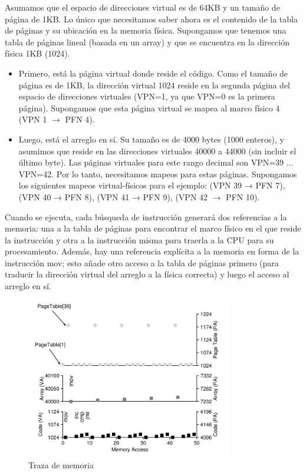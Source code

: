 \documentclass{article}
\begin{document}
Asumamos que el espacio de direcciones virtual es de 64KB y un tamaño de página de 1KB. Lo único que necesitamos saber ahora es el contenido de la tabla de páginas y su ubicación en la memoria física. Supongamos que tenemos una tabla de páginas lineal (basada en un array) y que se encuentra en la dirección física 1KB (1024).
\begin{itemize}
    \item Primero, está la página virtual donde reside el código. Como el tamaño de página es de 1KB, la dirección virtual 1024 reside en la segunda página del espacio de direcciones virtuales (VPN=1, ya que VPN=0 es la primera página). Supongamos que esta página virtual se mapea al marco físico 4 (VPN 1 $\rightarrow$ PFN 4).
    \item Luego, está el arreglo en sí. Su tamaño es de 4000 bytes (1000 enteros), y asumimos que reside en las direcciones virtuales 40000 a 44000 (sin incluir el último byte). Las páginas virtuales para este rango decimal son VPN=39 ... VPN=42. Por lo tanto, necesitamos mapeos para estas páginas. Supongamos los siguientes mapeos virtual-físicos para el ejemplo: (VPN 39 → PFN 7), (VPN 40 → PFN 8), (VPN 41 → PFN 9), (VPN 42 $\rightarrow$ PFN 10).
\end{itemize}

Cuando se ejecuta, cada búsqueda de instrucción generará dos referencias a la memoria: una a la tabla de páginas para encontrar el marco físico en el que reside la instrucción y otra a la instrucción misma para traerla a la CPU para su procesamiento. Además, hay una referencia explícita a la memoria en forma de la instrucción mov; esto añade otro acceso a la tabla de páginas primero (para traducir la dirección virtual del arreglo a la física correcta) y luego el acceso al arreglo en sí.

\begin{figure}[h]
    \centering
    \includegraphics[width=0.8\textwidth]{src/trazamemoria.png}
    \caption{Traza de memoria}
\end{figure}
\end{document}
